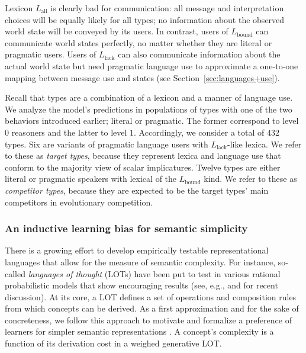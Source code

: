 \documentclass[a4paper, 11pt]{article}
\theoremstyle{Satz}
\newcommand{\mylang}[1]{\ensuremath{L_{\text{#1}}}\xspace} %
\newcommand{\Lall}{\mylang{all}}
\newcommand{\Lbound}{\mylang{bound}}
\newcommand{\Llack}{\mylang{lack}}
\begin{document}
Lexicon $\Lall$ is clearly bad for communication: all message and interpretation choices will
be equally likely for all types; no information about the observed world state will be conveyed
by its users. In contrast, users of $\Lbound$ can communicate world states perfectly, no matter
whether they are literal or pragmatic users. Users of $\Llack$ can also communicate information
about the actual world state but need pragmatic language use to approximate a one-to-one
mapping between message use and states (see Section~\ref{sec:languages+use}).

Recall that types are a combination of a lexicon and a manner of language use. We analyze the
model's predictions in populations of types with one of the two behaviors introduced earlier;
literal or pragmatic. The former correspond to level $0$ reasoners and the latter to level
$1$. Accordingly, we consider a total of $432$ types. Six are variants of pragmatic language
users with $\Llack$-like lexica. We refer to these as \emph{target types}, because they
represent lexica and language use that conform to the majority view of scalar
implicatures. Twelve types are either literal or pragmatic speakers with lexical of the
$\Lbound$ kind. We refer to these as \emph{competitor types}, because they are expected to be
the target types' main competitors in evolutionary competition.



\subsubsection{An inductive learning bias for semantic simplicity}
\label{sec:an-induct-learn}

There is a growing effort to develop empirically testable representational languages that allow
for the measure of semantic complexity. For instance, so-called {\em languages of thought}
(LOTs) have been put to test in various rational probabilistic models that show encouraging
results (see, e.g., \citealt{katz+etal:2008, piantadosi+etal:underreview,
  piantadosi+etal:2012a} and \citealt{piantadosi+jacobs:2016} for recent discussion). At its
core, a LOT defines a set of operations and composition rules from which concepts can be
derived. As a first approximation and for the sake of concreteness, we follow this approach to
motivate and formalize a preference of learners for simpler semantic representations
\citep{feldman:2000, chater+vitanyi:2003, piantadosi+etal:2012a,
  kirby+etal:2015,piantadosi+etal:underreview}. A concept's complexity is a function of its
derivation cost in a weighed generative LOT.
\end{document}
